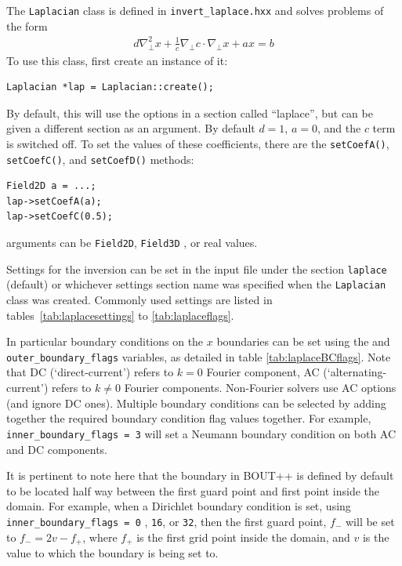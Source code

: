 \documentclass[12pt]{article}
\newcommand{\code}[1]{\texttt{#1}}
\begin{document}
The
%
\lstinline!Laplacian!
%
 class is defined in \texttt{invert\_laplace.hxx} and solves problems of the
 form
%
\begin{align}
d\nabla_\perp^2 x + \frac{1}{c}\nabla_\perp c \cdot\nabla_\perp x + a x = b
\end{align}
%
To use this class, first create an instance of it:
%
\begin{lstlisting}
Laplacian *lap = Laplacian::create();
\end{lstlisting}
%
By default, this will use the options in a section called ``laplace'', but can
be given a different section as an argument.  By default $d = 1$, $a = 0$, and
the $c$ term is switched off. To set the values of these coefficients, there
are the
%
\lstinline!setCoefA()!, \lstinline!setCoefC()!, and \lstinline!setCoefD()!
%
methods:
%
\begin{lstlisting}
Field2D a = ...;
lap->setCoefA(a);
lap->setCoefC(0.5);
\end{lstlisting}
%
arguments can be
%
\lstinline!Field2D!, \lstinline!Field3D!
%
, or real values.

Settings for the inversion can be set in the input file under the section
\code{laplace} (default) or whichever settings section name was specified when
the
%
\lstinline!Laplacian!
%
 class was created.  Commonly used settings are listed in
 tables~\ref{tab:laplacesettings} to \ref{tab:laplaceflags}.

In particular boundary conditions on the $x$ boundaries can be set using the
 and \code{outer\_boundary\_flags} variables, as
detailed in table \ref{tab:laplaceBCflags}.  Note that DC (`direct-current')
refers to $k = 0$ Fourier component, AC (`alternating-current') refers to $k
\neq 0$ Fourier components.  Non-Fourier solvers use AC options (and ignore DC
ones).  Multiple boundary conditions can be selected by adding together the
required boundary condition flag values together.  For example,
%
\lstinline!inner_boundary_flags = 3!
%
 will set a Neumann boundary condition on both AC and DC components.

It is pertinent to note here that the boundary in BOUT++ is defined by default
to be located half way between the first guard point and first point inside the
domain.  For example, when a Dirichlet boundary condition is set, using
%
\lstinline!inner_boundary_flags = 0!
%
, \code{16}, or \code{32}, then the first guard point, $f_{-}$ will be set to
$f_{-} = 2v - f_+$, where $f_+$ is the first grid point inside the domain, and
$v$ is the value to which the boundary is being set to.
\end{document}
